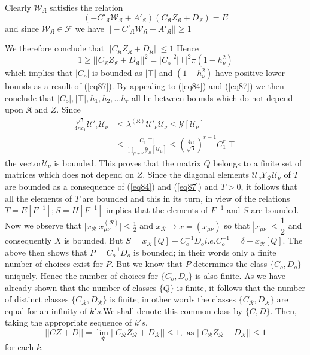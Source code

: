 Clearly $\mathcal{W}_\mathfrak{K}$ satisfies the relation
$$
(-C'_\mathfrak{K} \mathcal{W}_\mathfrak{K} +A'_\mathfrak{K})
(C_\mathfrak{K} Z_\mathfrak{K} + D_\mathfrak{K}) = E 
$$
and since $\mathcal{W}_\mathfrak{K} \in \mathcal{F}$ we have $|| -
C'_\mathfrak{K} \mathcal{W}_\mathfrak{K} + A'_\mathfrak{K} || \geq 1$ 

We therefore conclude that $|| C_\mathfrak{K} Z_\mathfrak{K} +
D_\mathfrak{K}|| \leq 1$ Hence  
$$ 
1 \geq || C_\mathfrak{K} Z_\mathfrak{K} + D_\mathfrak{K}||^2 =  | C_o |^2
| \top |^2 \pi(1-h^2_\nu) 
$$
which implies that $| C_o |$ is bounded as $| \top |$ and
$(1+h^2_\nu)$ have positive lower bounds as a result of (\ref{eq87}). By
appealing to (\ref{eq84}) and (\ref{eq87}) we then conclude that
$|C_o|, | \top |, h_1, h_2, \ldots h_r$ all lie between bounds which
do not depend upon $\mathfrak{K}$ and $Z$. Since  
\begin{align*}
\frac{\sqrt{3}}{4nc_1}\mathscr{U'}_\nu \mathscr{U}_\nu & \leq
\lambda^{(\mathfrak{K})} \mathscr{U'}_\nu \mathscr{U}_\nu \leq
\mathcal{Y}[\mathscr{U}_\nu ]\\ 
& \leq \frac{C_1| \top |}{\prod_{\mu \neq
    \nu}\mathcal{Y}_\mathfrak{K}[\mathscr{U}_\mu ]}\leq
(\frac{4n}{\sqrt{3}})^{r-1}C^r_1 |\top | 
\end{align*}
the vector\pageoriginale $\mathscr{U}_{\nu}$ is bounded. This proves
that the matrix 
$Q$ belongs to a finite set of matrices which does not depend on
$Z$. Since the diagonal elements $\mathscr{U}_{\nu}
Y_{\mathscr{R}}\mathscr{U}_{\nu}$ of $T$ are bounded as a consequence
of (\ref{eq84}) and (\ref{eq87}) and $T > 0$, it follows that all the
elements of 
$T$ are bounded and this in its turn, in view of the relations $T = E
[ F^{-1}]; S = H [F^{-1}]$ implies that the elements of $F^{-1}$ and
$S$ are bounded. Now we observe that $| x_{\mathscr{R}} |
x^{(\mathscr{R})}_{\mu \nu}| \leq \frac{1}{2}$ and $x_{\mathscr{R}}
\to x = ( x_{\mu \nu})$ so that $|x_{\mu \nu} | \leq \dfrac{1}{2}$ and
consequently  $X$ is bounded. But $S = x_{\mathscr{R}} [Q] + C^{-1}_o
D_o i.e. C_o^{-1} = \delta -x_{\mathscr{R}}[Q]$. The above then shows
that $P =  C^{-1}_o D_o$ is bounded; in their words only a finite
number of choices exist for $P$. But we know that $P$ determines the
class $\{ C_o, D_o \}$ uniquely. Hence the number of choices for $\{
C_o, D_o \}$ is also finite. As we have already shown that the number
of classes $\{Q \}$ is finite, it follows that the number of distinct
classes $\{ C_{\mathscr{R}}, D_{\mathscr{R}} \}$ is finite; in other
words the classes $\{ C_{\mathscr{R}}, D_{\mathscr{R}} \}$ are equal
for an infinity of $k' s$.We shall denote this common class by $\{ C,
D \}$. Then, taking the appropriate sequence of $k' s$, 
$$
|| CZ + D || = \lim_{\mathscr{R}}|| C_{\mathscr{R}} Z_{\mathscr{R}} +
D_{\mathscr{R}}|| \leq 1, \text{ as } || C_{\mathscr{R}}
Z_{\mathscr{R}} + D_{\mathscr{R}}|| \leq 1 
$$
for each $k$.

